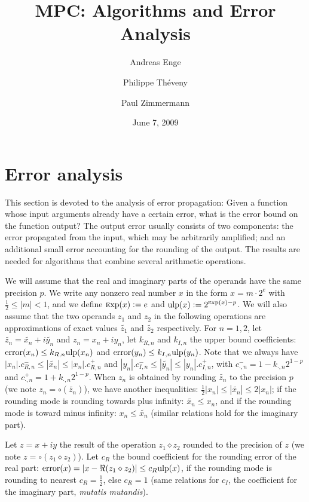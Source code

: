 \documentclass {article}
\title {MPC: Algorithms and Error Analysis}
\author {Andreas Enge \and Philippe Th\'eveny \and Paul Zimmermann}
\date {June 7, 2009}
\newcommand {\Ulp}{{\rm ulp}}
\DeclareMathOperator{\error}{error}
\DeclareMathOperator{\Exp}{{\rm \textsc exp}}
\begin{document}
\maketitle
\tableofcontents


\section {Error analysis}

This section is devoted to the analysis of error propagation: Given a function
whose input arguments already have a certain error, what is the error bound on
the function output? The output error usually consists of two components: the
error propagated from the input, which may be arbitrarily amplified; and an
additional small error accounting for the rounding of the output. The results
are needed for algorithms that combine several arithmetic operations.

We will assume that the real and imaginary parts of the operands have the same
precision $p$. We write any nonzero real number $x$ in the form $x = m \cdot
2^e$ with $\frac{1}{2} \le |m| < 1$, and we define $\Exp(x) := e$ and $\Ulp(x)
:= 2^{\Exp(x) - p}$.  We will also assume that the two operands $z_1$ and
$z_2$ in the following operations are approximations of exact values
$\widetilde{z_1}$ and $\widetilde{z_2}$ respectively. For $n=1, 2$, let
$\widetilde{z_n} = \widetilde{x_n} + i \widetilde{y_n}$ and $z_n = x_n + i
y_n$, let $k_{R,n}$ and $k_{I,n}$ the upper bound coefficients: $\error(x_n)
\leq k_{R,n} \Ulp(x_n)$ and $\error(y_n) \leq k_{I,n} \Ulp(y_n)$.  Note that
we always have $|x_n|.c_{R,n}^- \leq |\widetilde{x_n}| \leq |x_n|.c_{R,n}^+$
and $|y_n|.c_{I,n}^- \leq |\widetilde{y_n}| \leq |y_n|.c_{I,n}^+$, with
$c_{\cdot,n}^- = 1-k_{\cdot,n}2^{1-p}$ and $c_{\cdot,n}^+ =
1+k_{\cdot,n}2^{1-p}$. When $z_n$ is obtained by rounding $\widetilde{z_n}$ to
the precision $p$ (we note $z_n=\circ(\widetilde{z_n})$), we have another
inequalities: $\frac{1}{2}|x_n| \leq |\widetilde{x_n}| \leq 2|x_n|$; if the
rounding mode is rounding towards plus infinity: $\widetilde{x_n} \leq x_n$,
and if the rounding mode is toward minus infinity: $x_n \leq \widetilde{x_n}$
(similar relations hold for the imaginary part).

Let $z=x+iy$ the result of the operation $z_1\diamond z_2$ rounded to the
precision of $z$ (we note $z=\circ(z_1 \diamond z_2)$). Let $c_R$ the bound
coefficient for the rounding error of the real part: $\error(x) = |x-\Re(z_1
\diamond z_2)| \leq c_R \Ulp(x)$, if the rounding mode is rounding to nearest
$c_R=\frac{1}{2}$, else $c_R=1$ (same relations for $c_I$, the coefficient for
the imaginary part, \emph{mutatis mutandis}).
\end{document}
